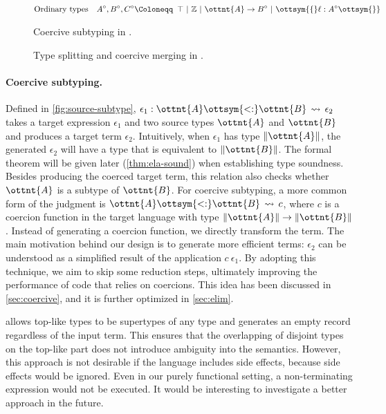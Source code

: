 \begin{figure}[t]
  \small
  \begin{align*}
    &\text{Ordinary types} &A^\circ, B^\circ, C^\circ\Coloneqq&~\,  \top  ~|~  \mathbb{Z}  ~|~ \ottnt{A}  \rightarrow  B^\circ  ~|~ \ottsym{\{}  \ell  :  A^\circ  \ottsym{\}} \\
  \end{align*}
  \ottdefnsCoSubtyping
  \caption{Coercive subtyping in \lambdaiplus.}\label{fig:source-subtype}
\end{figure}

\begin{figure}
  \small
  \ottdefnsSplitType
  \ottdefnsCoMerge
  \caption{Type splitting and coercive merging in \lambdaiplus.}\label{fig:source-split}
\end{figure}

\paragraph{Coercive subtyping.}
Defined in \autoref{fig:source-subtype}, $\epsilon_{{\mathrm{1}}}  :  \ottnt{A}  \ottsym{<:}  \ottnt{B}  \,\rightsquigarrow\,  \epsilon_{{\mathrm{2}}}$ takes a target
expression $\epsilon_{{\mathrm{1}}}$ and two source types $\ottnt{A}$ and $\ottnt{B}$ and produces a
target term $\epsilon_{{\mathrm{2}}}$. Intuitively, when $\epsilon_{{\mathrm{1}}}$ has type $\|  \ottnt{A}  \|$, the
generated $\epsilon_{{\mathrm{2}}}$ will have a type that is equivalent to $\|  \ottnt{B}  \|$. The
formal theorem will be given later (\autoref{thm:ela-sound}) when establishing
type soundness. Besides producing the coerced target term, this relation also
checks whether $\ottnt{A}$ is a subtype of $\ottnt{B}$. For coercive subtyping, a more
common form of the judgment is $ \ottnt{A}   \ottsym{<:}   \ottnt{B}   \,\rightsquigarrow\,  c $, where $c$ is a coercion function
in the target language with type $\|  \ottnt{A}  \|  \rightarrow  \|  \ottnt{B}  \|$. Instead of generating a
coercion function, we directly transform the term. The main motivation behind
our design is to generate more efficient terms: $\epsilon_{{\mathrm{2}}}$ can be understood as a
simplified result of the application $c~\epsilon_{{\mathrm{1}}}$. By adopting this technique, we
aim to skip some reduction steps, ultimately improving the performance of code
that relies on coercions. This idea has been discussed in
\autoref{sec:coercive}, and it is further optimized in \autoref{sec:elim}.

 allows top-like types to be supertypes of any type and generates an
empty record regardless of the input term. This ensures that the overlapping of
disjoint types on the top-like part does not introduce ambiguity into the
semantics. However, this approach is not desirable if the language includes side
effects, because side effects would be ignored. Even in our purely functional
setting, a non-terminating expression would not be executed. It would be
interesting to investigate a better approach in the future.

